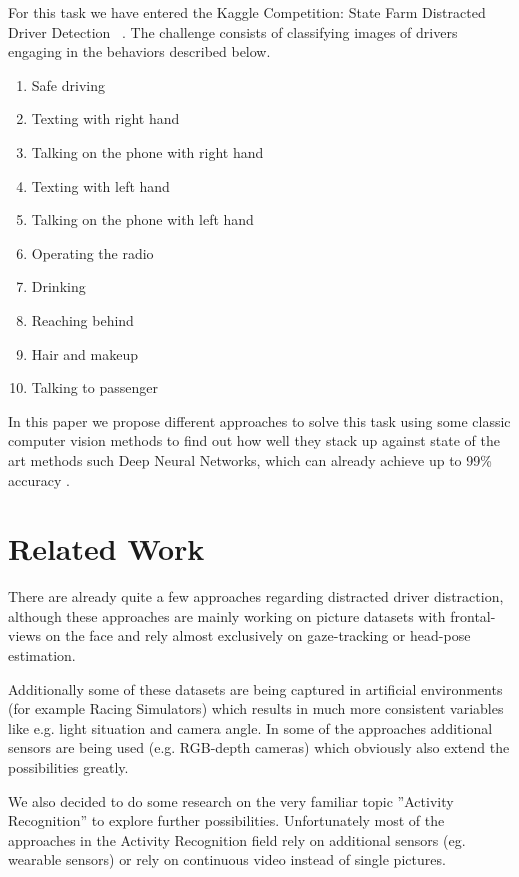 \documentclass[10pt,twocolumn,letterpaper]{article}
\begin{document}
For this task we have entered the Kaggle Competition: State Farm Distracted Driver Detection ~\cite{Kaggle}. The challenge consists of classifying images of drivers engaging in the behaviors described below.

\begin{enumerate}
	\item Safe driving
	\item Texting with right hand
	\item Talking on the phone with right hand
	\item Texting with left hand
	\item Talking on the phone with left hand
	\item Operating the radio
	\item Drinking
	\item Reaching behind
	\item Hair and makeup
	\item Talking to passenger
\end{enumerate}

In this paper we propose different approaches to solve this task using some classic computer vision methods to find out how well they stack up against state of the art methods such Deep Neural Networks, which can already achieve up to 99\% accuracy .



\section{Related Work}

There are already quite a few approaches regarding distracted driver distraction, although these approaches are mainly working on picture datasets with frontal-views on the face and rely almost exclusively on gaze-tracking or head-pose estimation. \cite{Dorazio} \cite{6957817}

Additionally some of these datasets are being captured in artificial environments (for example Racing Simulators) \cite{itsc:bergasa2008} which results in much more consistent variables like e.g. light situation and camera angle. In some of the approaches additional sensors are being used (e.g. RGB-depth cameras) which obviously also extend the possibilities greatly. \cite{Ragab2014}

We also decided to do some research on the very familiar topic ''Activity Recognition'' to explore further possibilities. Unfortunately most of the approaches in the Activity Recognition field rely on additional sensors (eg. wearable sensors) \cite{6258525} \cite{6365160} or rely on continuous video instead of single pictures. \cite{1315249} \cite{1430826}
\end{document}
